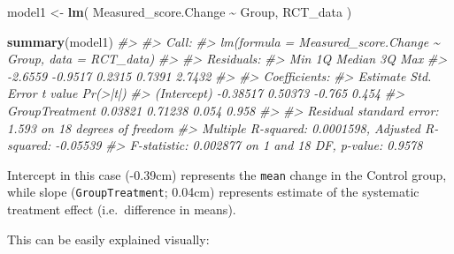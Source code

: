 \documentclass[
]{book}
\newenvironment{Shaded}{\begin{snugshade}}{\end{snugshade}}
\newcommand{\CommentTok}[1]{\textcolor[rgb]{0.56,0.35,0.01}{\textit{#1}}}
\newcommand{\KeywordTok}[1]{\textcolor[rgb]{0.13,0.29,0.53}{\textbf{#1}}}
\newcommand{\NormalTok}[1]{#1}
\newcommand{\OperatorTok}[1]{\textcolor[rgb]{0.81,0.36,0.00}{\textbf{#1}}}
\newcommand{\StringTok}[1]{\textcolor[rgb]{0.31,0.60,0.02}{#1}}
\begin{document}
\begin{Shaded}
\begin{Highlighting}[]
\NormalTok{model1 <{-}}\StringTok{ }\KeywordTok{lm}\NormalTok{(}
\NormalTok{  Measured\_score.Change }\OperatorTok{\textasciitilde{}}\StringTok{ }\NormalTok{Group,}
\NormalTok{  RCT\_data}
\NormalTok{)}

\KeywordTok{summary}\NormalTok{(model1)}
\CommentTok{\#> }
\CommentTok{\#> Call:}
\CommentTok{\#> lm(formula = Measured\_score.Change \textasciitilde{} Group, data = RCT\_data)}
\CommentTok{\#> }
\CommentTok{\#> Residuals:}
\CommentTok{\#>     Min      1Q  Median      3Q     Max }
\CommentTok{\#> {-}2.6559 {-}0.9517  0.2315  0.7391  2.7432 }
\CommentTok{\#> }
\CommentTok{\#> Coefficients:}
\CommentTok{\#>                Estimate Std. Error t value Pr(>|t|)}
\CommentTok{\#> (Intercept)    {-}0.38517    0.50373  {-}0.765    0.454}
\CommentTok{\#> GroupTreatment  0.03821    0.71238   0.054    0.958}
\CommentTok{\#> }
\CommentTok{\#> Residual standard error: 1.593 on 18 degrees of freedom}
\CommentTok{\#> Multiple R{-}squared:  0.0001598,	Adjusted R{-}squared:  {-}0.05539 }
\CommentTok{\#> F{-}statistic: 0.002877 on 1 and 18 DF,  p{-}value: 0.9578}
\end{Highlighting}
\end{Shaded}

Intercept in this case (-0.39cm) represents the \texttt{mean} change in the Control group, while slope (\texttt{GroupTreatment}; 0.04cm) represents estimate of the systematic treatment effect (i.e.~difference in means).

This can be easily explained visually:
\end{document}
